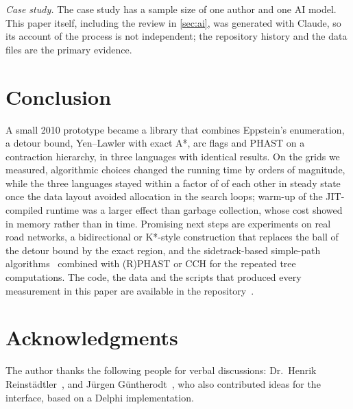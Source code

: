 \documentclass[11pt,a4paper]{article}
\begin{document}
\emph{Case study.} The case study has a sample size of one author and one AI model. This paper itself, including
the review in \cref{sec:ai}, was generated with Claude, so its account of the process is not independent; the
repository history and the data files are the primary evidence.

\section{Conclusion}
A small 2010 prototype became a library that combines Eppstein's enumeration, a detour bound, Yen--Lawler with
exact A*, arc flags and PHAST on a contraction hierarchy, in three languages with identical results. On the grids
we measured, algorithmic choices changed the running time by orders of magnitude, while the three languages stayed
within a factor of \NumMaxRatioTreeLong{} of each other in steady state once the data layout avoided allocation in
the search loops; warm-up of the JIT-compiled runtime was a larger effect than garbage collection, whose cost
showed in memory rather than in time. Promising next
steps are experiments on real road networks, a bidirectional or K*-style construction that replaces the ball of
the detour bound by the exact region, and the sidetrack-based simple-path algorithms~\cite{kurz2016,alzoobi2023}
combined with (R)PHAST or CCH for the repeated tree computations. The code, the data and the scripts that produced
every measurement in this paper are available in the repository~\cite{repo}.

\section*{Acknowledgments}
The author thanks the following people for verbal discussions: Dr.~Henrik Reinstädtler~\cite{reinstaedtler}, and Jürgen
Güntherodt~\cite{guentherodt}, who also contributed ideas for the interface, based on a Delphi implementation.



\end{document}
